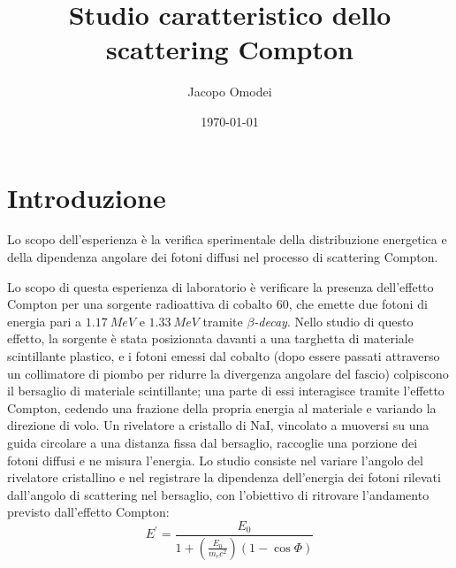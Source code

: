 \documentclass[10pt,twocolumn]{article}
\title{Studio caratteristico dello scattering Compton}
\author{Jacopo Omodei}
\date{\today}
\begin{document}

\tableofcontents
\section{Introduzione}
\label{sec:intro}

Lo scopo dell’esperienza è la verifica sperimentale della distribuzione energetica e della dipendenza angolare dei fotoni diffusi nel processo di scattering Compton. 

Lo scopo di questa esperienza di laboratorio è verificare la presenza dell'effetto Compton per una sorgente radioattiva di cobalto 60, che emette due fotoni di energia pari a $\SI{1.17}{MeV}$ e $\SI{1.33}{MeV}$ tramite $\beta$\textit{-decay}. Nello studio di questo effetto, la sorgente è stata posizionata davanti a una targhetta di materiale scintillante plastico, e i fotoni emessi dal cobalto (dopo essere passati attraverso un collimatore di piombo per ridurre la divergenza angolare del fascio) colpiscono il bersaglio di materiale scintillante; una parte di essi interagisce tramite l'effetto Compton, cedendo una frazione della propria energia al materiale e variando la direzione di volo. Un rivelatore a cristallo di NaI, vincolato a muoversi su una guida circolare a una distanza fissa dal bersaglio, raccoglie una porzione dei fotoni diffusi e ne misura l'energia. Lo studio consiste nel variare l'angolo del rivelatore cristallino e nel registrare la dipendenza dell'energia dei fotoni rilevati dall'angolo di scattering nel bersaglio, con l'obiettivo di ritrovare l'andamento previsto dall'effetto Compton:
\begin{equation}
E^\prime = \frac{E_0}{1+\left(\frac{E_0}{m_ec^2}\right)\left(1-\cos\Phi\right)}
\label{eq:Compton_formula}
\end{equation}
\end{document}
